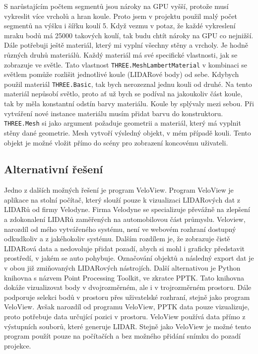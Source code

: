 \documentclass[czech,bachelor,dept420,male,cpdeclaration]{diploma}
\begin{document}
S narůstajícím počtem segmentů jsou nároky na GPU vyšší, protože musí vykreslit více vrcholů a hran koule. Proto jsem v projektu použil malý počet segmentů na výšku i šířku koulí \num{5}. Když vezmu v potaz, že každé vykreslení mraku bodů má \num{25000} takových koulí, tak budu chtít nároky na GPU co nejnižší.
Dále potřebuji ještě materiál, který mi vyplní všechny stěny a vrcholy. Je hodně různých druhů materiálů. Každý materiál má své specifické vlastnosti, jak se zobrazuje ve světle. Tato vlastnost \texttt{THREE.MeshLambertMaterial} v kombinaci se světlem pomůže rozlišit jednotlivé koule (LIDARové body) od sebe. Kdybych použil materiál \texttt{THREE.Basic}, tak bych nerozeznal jednu kouli od druhé. Na tento materiál nepůsobí světlo, proto ať už bych se podíval na jakoukoliv část koule, tak by měla konstantní odstín barvy materiálu. Koule by splývaly mezi sebou. Při vytváření nové instance materiálu musím přidat barvu do konstruktoru. \texttt{THREE.Mesh} si jako argument požaduje geometrii a materiál, který má vyplnit stěny dané geometrie. Mesh vytvoří výsledný objekt, v mém případě kouli. Tento objekt je možné vložit přímo do scény pro zobrazení koncovému uživateli.

\subsection{Alternativní řešení}
Jedno z dalších možných řešení je program VeloView. Program VeloView je aplikace na stolní počítač, který slouží pouze k vizualizaci LIDARových dat z LIDARů od firmy Velodyne. Firma Velodyne se specializuje převážně na zlepšení a zdokonalení LIDARů zaměřených na automobilovou část průmyslu. Veloview, narozdíl od mého vytvářeného systému, není ve webovém rozhraní dostupný odkudkoliv a z jakéhokoliv systému. Dalším rozdílem je, že zobrazuje čistě LIDARová data a nedovoluje přidat pozadí, abych si mohl i graficky představit prostředí, v jakém se auto pohybuje. Označování objektů a následný export dat je v obou již zmiňovaných LIDARových nástrojích.
Další alternativou je Python knihovna s názvem Point Processing Toolkit, ve zkratce PPTK. Tato knihovna dokáže vizualizovat body v dvojrozměrném, ale i v trojrozměrném prostoru. Dále podporuje selekci bodů v prostoru přes uživatelské rozhraní, stejně jako program VeloView. Avšak narozdíl od programu VeloView, PPTK data pouze vizualizuje, proto potřebuje data určující pozici v prostoru. VeloView používá data přímo z výstupních souborů, které generuje LIDAR. Stejně jako VeloView je možné tento program použít pouze na počítačích a bez možného přidání snímku do pozadí projekce.
\end{document}
